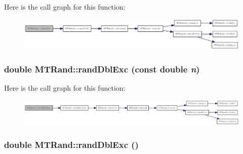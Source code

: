 Here is the call graph for this function:\nopagebreak
\begin{figure}[H]
\begin{center}
\leavevmode
\includegraphics[width=406pt]{classMTRand_a15f4daf79febbe4ff43c3e6ce2c4fcbe_cgraph}
\end{center}
\end{figure}
\hypertarget{classMTRand_a1a81d8f00de8f553d4b8626d64e1c544}{
\subsubsection[{randDblExc}]{\setlength{\rightskip}{0pt plus 5cm}double MTRand::randDblExc (const double {\em n})}}
\label{classMTRand_a1a81d8f00de8f553d4b8626d64e1c544}


Here is the call graph for this function:\nopagebreak
\begin{figure}[H]
\begin{center}
\leavevmode
\includegraphics[width=420pt]{classMTRand_a1a81d8f00de8f553d4b8626d64e1c544_cgraph}
\end{center}
\end{figure}
\hypertarget{classMTRand_a4d3a475aa72fe6d1a6d7d9e16d6a732e}{
\subsubsection[{randDblExc}]{\setlength{\rightskip}{0pt plus 5cm}double MTRand::randDblExc ()}}
\label{classMTRand_a4d3a475aa72fe6d1a6d7d9e16d6a732e}



